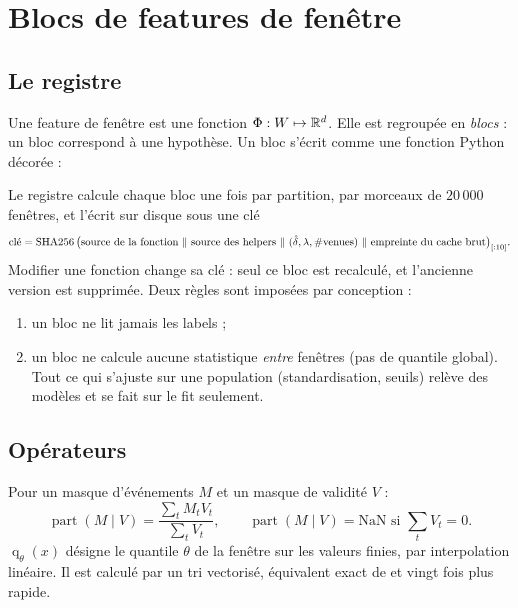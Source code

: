 \section{Blocs de features de fenêtre}\label{sec:blocs}

\subsection{Le registre}
Une feature de fenêtre est une fonction $\Phi:W\mapsto\mathbb{R}^{d}$. Elle est regroupée en \emph{blocs} : un bloc correspond à une hypothèse. Un bloc s'écrit comme une fonction Python décorée :
\begin{center}\end{center}
Le registre calcule chaque bloc une fois par partition, par morceaux de $20\,000$ fenêtres, et l'écrit sur disque sous une clé
\begin{equation}
\text{clé}=\operatorname{SHA256}\big(\text{source de la fonction}\ \|\ \text{source des helpers}\ \|\ (\hat\tick,\lot,\#\text{venues})\ \|\ \text{empreinte du cache brut}\big)_{[:10]} .
\end{equation}
Modifier une fonction change sa clé : seul ce bloc est recalculé, et l'ancienne version est supprimée. Deux règles sont imposées par conception :
\begin{enumerate}
\item un bloc ne lit jamais les labels ;
\item un bloc ne calcule aucune statistique \emph{entre} fenêtres (pas de quantile global). Tout ce qui s'ajuste sur une population (standardisation, seuils) relève des modèles et se fait sur le fit seulement.
\end{enumerate}

\subsection{Opérateurs}
Pour un masque d'événements $M$ et un masque de validité $V$ :
\begin{equation}
\operatorname{part}(M\mid V)=\frac{\sum_t M_tV_t}{\sum_tV_t},\qquad\operatorname{part}(M\mid V)=\text{NaN si }\textstyle\sum_tV_t=0 .
\end{equation}
$\operatorname{q}_\theta(x)$ désigne le quantile $\theta$ de la fenêtre sur les valeurs finies, par interpolation linéaire. Il est calculé par un tri vectorisé, équivalent exact de  et vingt fois plus rapide.

